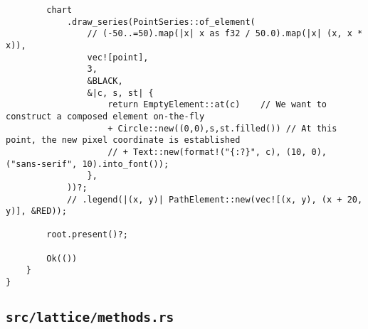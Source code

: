 \begin{verbatim}
        chart
            .draw_series(PointSeries::of_element(
                // (-50..=50).map(|x| x as f32 / 50.0).map(|x| (x, x * x)),
                vec![point],
                3,
                &BLACK,
                &|c, s, st| {
                    return EmptyElement::at(c)    // We want to construct a composed element on-the-fly
                    + Circle::new((0,0),s,st.filled()) // At this point, the new pixel coordinate is established
                    // + Text::new(format!("{:?}", c), (10, 0), ("sans-serif", 10).into_font());
                },
            ))?;
            // .legend(|(x, y)| PathElement::new(vec![(x, y), (x + 20, y)], &RED));

        root.present()?;

        Ok(())
    }
}
\end{verbatim}


\subsection{\texttt{src/lattice/methods.rs}}

